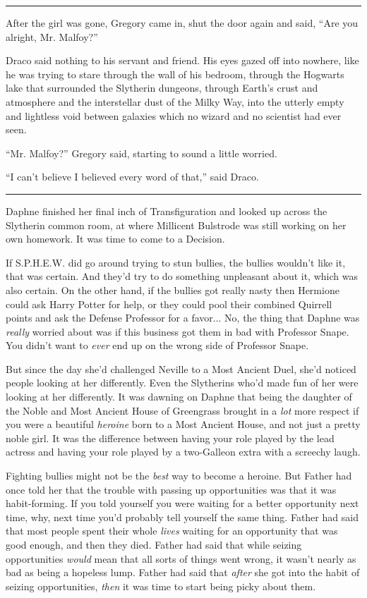 \begin{center}\rule{3in}{0.4pt}\end{center}

After the girl was gone, Gregory came in, shut the door again and said,
``Are you alright, Mr. Malfoy?''

Draco said nothing to his servant and friend. His eyes gazed off into
nowhere, like he was trying to stare through the wall of his bedroom,
through the Hogwarts lake that surrounded the Slytherin dungeons,
through Earth's crust and atmosphere and the interstellar dust of the
Milky Way, into the utterly empty and lightless void between galaxies
which no wizard and no scientist had ever seen.

``Mr. Malfoy?'' Gregory said, starting to sound a little worried.

``I can't believe I believed every word of that,'' said Draco.

\begin{center}\rule{3in}{0.4pt}\end{center}

Daphne finished her final inch of Transfiguration and looked up across
the Slytherin common room, at where Millicent Bulstrode was still
working on her own homework. It was time to come to a Decision.

If S.P.H.E.W. did go around trying to stun bullies, the bullies wouldn't
like it, that was certain. And they'd try to do something unpleasant
about it, which was also certain. On the other hand, if the bullies got
really nasty then Hermione could ask Harry Potter for help, or they
could pool their combined Quirrell points and ask the Defense Professor
for a favor... No, the thing that Daphne was \emph{really} worried
about was if this business got them in bad with Professor Snape. You
didn't want to \emph{ever} end up on the wrong side of Professor Snape.

But since the day she'd challenged Neville to a Most Ancient Duel, she'd
noticed people looking at her differently. Even the Slytherins who'd
made fun of her were looking at her differently. It was dawning on
Daphne that being the daughter of the Noble and Most Ancient House of
Greengrass brought in a \emph{lot} more respect if you were a beautiful
\emph{heroine} born to a Most Ancient House, and not just a pretty noble
girl. It was the difference between having your role played by the lead
actress and having your role played by a two-Galleon extra with a
screechy laugh.

Fighting bullies might not be the \emph{best} way to become a heroine.
But Father had once told her that the trouble with passing up
opportunities was that it was habit-forming. If you told yourself you
were waiting for a better opportunity next time, why, next time you'd
probably tell yourself the same thing. Father had said that most people
spent their whole \emph{lives} waiting for an opportunity that was good
enough, and then they died. Father had said that while seizing
opportunities \emph{would} mean that all sorts of things went wrong, it
wasn't nearly as bad as being a hopeless lump. Father had said that
\emph{after} she got into the habit of seizing opportunities,
\emph{then} it was time to start being picky about them.

